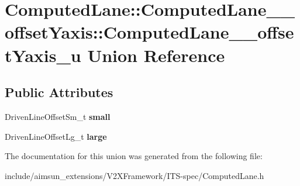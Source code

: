 \hypertarget{unionComputedLane_1_1ComputedLane____offsetYaxis_1_1ComputedLane____offsetYaxis__u}{}\section{Computed\+Lane\+:\+:Computed\+Lane\+\_\+\+\_\+offset\+Yaxis\+:\+:Computed\+Lane\+\_\+\+\_\+offset\+Yaxis\+\_\+u Union Reference}
\label{unionComputedLane_1_1ComputedLane____offsetYaxis_1_1ComputedLane____offsetYaxis__u}
\subsection*{Public Attributes}
\begin{DoxyCompactItemize}
\item 
Driven\+Line\+Offset\+Sm\+\_\+t {\bfseries small}\hypertarget{unionComputedLane_1_1ComputedLane____offsetYaxis_1_1ComputedLane____offsetYaxis__u_a2eeef670b102d41a864e646ef968605a}{}\label{unionComputedLane_1_1ComputedLane____offsetYaxis_1_1ComputedLane____offsetYaxis__u_a2eeef670b102d41a864e646ef968605a}

\item 
Driven\+Line\+Offset\+Lg\+\_\+t {\bfseries large}\hypertarget{unionComputedLane_1_1ComputedLane____offsetYaxis_1_1ComputedLane____offsetYaxis__u_a07f79d04ef527b8090632bcb8bea9792}{}\label{unionComputedLane_1_1ComputedLane____offsetYaxis_1_1ComputedLane____offsetYaxis__u_a07f79d04ef527b8090632bcb8bea9792}

\end{DoxyCompactItemize}


The documentation for this union was generated from the following file\+:\begin{DoxyCompactItemize}
\item 
include/aimsun\+\_\+extensions/\+V2\+X\+Framework/\+I\+T\+S-\/spec/Computed\+Lane.\+h\end{DoxyCompactItemize}
